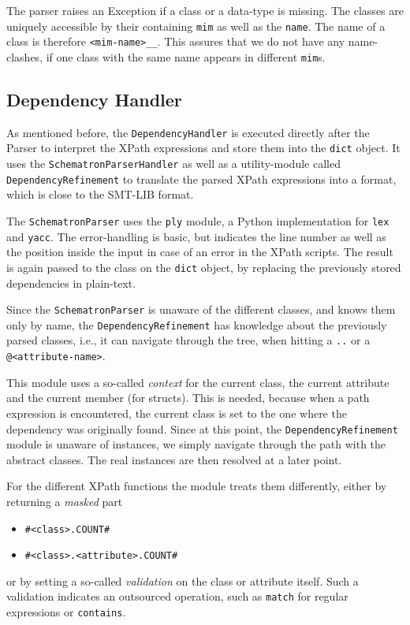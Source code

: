 The parser raises an Exception if a class or a data-type is missing. The classes are uniquely accessible by their containing \verb|mim| as well as the \verb|name|. The name of a class is therefore \texttt{<mim-name>\_\_<class-name>}. This assures that we do not have any name-clashes, if one class with the same name appears in different \verb|mim|s.

\subsection*{Dependency Handler}

As mentioned before, the \verb|DependencyHandler| is executed directly after the Parser to interpret the XPath expressions and store them into the \verb|dict| object. 
It uses the \verb|SchematronParserHandler| as well as a utility-module called \verb|DependencyRefinement| to translate the parsed XPath expressions into a format, which is close to the SMT-LIB format.


The \verb|SchematronParser| uses the \verb|ply| module, a Python implementation for \verb|lex| and \verb|yacc|. The error-handling is basic, but indicates the line number as well as the position inside the input in case of an error in the XPath scripts. The result is again passed to the class on the \verb|dict| object, by replacing the previously stored dependencies in plain-text.


Since the \verb|SchematronParser| is unaware of the different classes, and knows them only by name, the \verb|DependencyRefinement| has knowledge about the previously parsed classes, i.e., it can navigate through the tree, when hitting a \verb|..| or a \verb|@<attribute-name>|. 

This module uses a so-called \emph{context} for the current class, the current attribute and the current member (for structs). This is needed, because when a path expression is encountered, the current class is set to the one where the dependency was originally found. Since at this point, the \verb|DependencyRefinement| module is unaware of instances, we simply navigate through the path with the abstract classes. The real instances are then resolved at a later point.

For the different XPath functions the module treats them differently, either by returning a \emph{masked} part
\begin{itemize}
 \item \texttt{\#<class>.COUNT\#}
 \item \texttt{\#<class>.<attribute>.COUNT\#}
\end{itemize}
or by setting a so-called \emph{validation} on the class or attribute itself. Such a validation indicates an outsourced operation, such as \verb|match| for regular expressions or \verb|contains|. 

